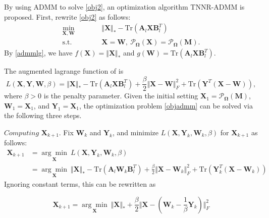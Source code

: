 \documentclass{article}
\begin{document}
{By using ADMM to solve \eqref{obj2}, an optimization algorithm TNNR-ADMM is proposed. First, rewrite \eqref{obj2} as follows:
\begin{equation}
    \begin{aligned}
        \underset{\mathbf X,\mathbf W}{\min}\qquad&\quad \Vert\mathbf X \Vert_* - \text{Tr}(\mathbf A_l\mathbf X\mathbf B_l^T) \\
        \text{s.t.}\qquad&\quad \mathbf X=\mathbf W, \ \mathcal{P}_{\mathbf\Omega}(\mathbf X) =  \mathcal{P}_{\mathbf\Omega}(\mathbf M).
    \end{aligned}\label{objadmm}
\end{equation}
By \eqref{admmlg}, we have $f(\mathbf X)=\Vert\mathbf X \Vert_*$ and $g(\mathbf W) = \text{Tr}(\mathbf A_l\mathbf X\mathbf B_l^T)$. 

The augmented lagrange function of is 
\begin{equation}
    L(\mathbf X,\mathbf Y,\mathbf W,\beta) = \Vert\mathbf X \Vert_* - \text{Tr}(\mathbf A_l\mathbf X\mathbf B_l^T) + \frac{\beta}{2}\Vert\mathbf X-\mathbf W \Vert_F^2 + \text{Tr}(\mathbf Y^T(\mathbf X-\mathbf W)),
\end{equation}
where $\beta > 0$ is  the penalty parameter. Given the initial setting $\mathbf X_1 = \mathcal{P}_{\mathbf\Omega}(\mathbf M)$, $\mathbf W_1 =\mathbf X_1$, and $\mathbf Y_1 =\mathbf X_1$, the optimization problem \eqref{objadmm} can be solved via the following three steps.

$\textit{Computing}$  $\mathbf X_{k+1}$. Fix $\mathbf W_k$ and $\mathbf Y_k$, and minimize $L(\mathbf X,\mathbf Y_k,\mathbf W_k,\beta)$ for $\mathbf X_{k+1}$ as follows:
\begin{equation}
\begin{aligned}
    \mathbf X_{k+1} & =\underset{\mathbf X}{\arg\min}\ L(\mathbf X,\mathbf Y_k, \mathbf W_k,\beta) \\
    & =  \underset{\mathbf X}{\arg\min} \ \Vert\mathbf X \Vert_* - \text{Tr}(\mathbf A_l\mathbf W_k\mathbf B_l^T)    + \frac{\beta}{2}\Vert\mathbf X-\mathbf W_k \Vert_F^2 + \text{Tr}(\mathbf Y_k^T(\mathbf X-\mathbf W_k))
\end{aligned}
\end{equation}
Ignoring constant terms, this can be rewritten as 

\begin{equation}
    \mathbf X_{k+1} = \underset{\mathbf X}{\arg\min} \ \Vert\mathbf X \Vert_* + \frac{\beta}{2} \Vert\mathbf X-\left(\mathbf W_k - \frac{1}{\beta}\mathbf Y_k \right) \Vert_F^2
\end{equation}


}
\end{document}
